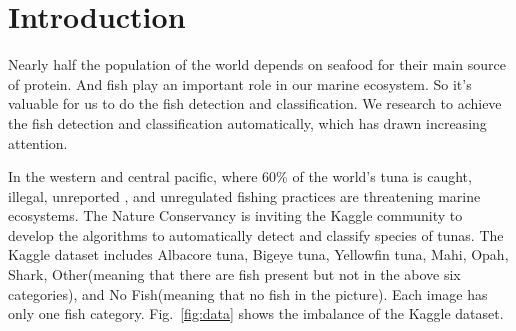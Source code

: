 \documentclass[conference]{IEEEtran}
\begin{document}



%
\IEEEpeerreviewmaketitle








\section{Introduction}



Nearly half the population of the world depends on seafood for their main source of protein. And fish play an important role in our marine ecosystem. So it's valuable for us to do the fish detection and classification. We research to achieve the fish detection and classification automatically, which has drawn increasing attention.\par

In the western and central pacific, where 60\% of the world's tuna is caught, illegal, unreported , and unregulated fishing practices are threatening marine ecosystems. The Nature Conservancy is inviting the Kaggle community to develop the algorithms to automatically detect and classify species of tunas. The Kaggle dataset includes Albacore tuna, Bigeye tuna, Yellowfin tuna, Mahi, Opah, Shark, Other(meaning that there are fish present but not in the above six categories), and No Fish(meaning that no fish in the picture). Each image has only one fish category. Fig.~\ref{fig:data} shows the imbalance of the Kaggle dataset. 
\end{document}
